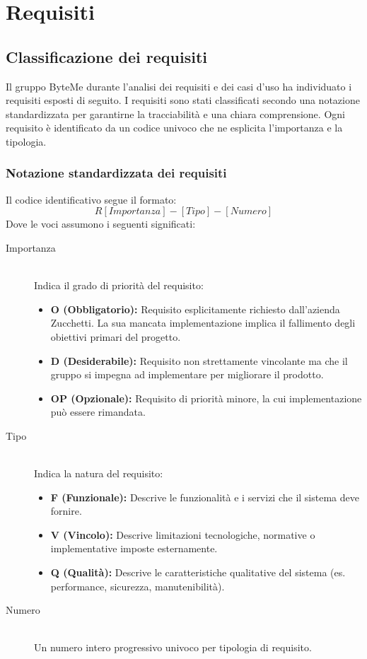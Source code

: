 \documentclass[11pt,a4paper]{article}
\begin{document}
\newpage

\section{Requisiti}
\subsection{Classificazione dei requisiti}
Il gruppo ByteMe durante l'analisi dei requisiti e dei casi d'uso ha individuato i requisiti esposti di seguito.
I requisiti sono stati classificati secondo una notazione standardizzata per garantirne la tracciabilità e una chiara comprensione.
Ogni requisito è identificato da un codice univoco che ne esplicita l'importanza e la tipologia.

\subsubsection{Notazione standardizzata dei requisiti}
Il codice identificativo segue il formato:
\[
R[Importanza]-[Tipo]-[Numero]
\]
Dove le voci assumono i seguenti significati:

\begin{description}
    \item[Importanza] \hfill \\
    Indica il grado di priorità del requisito:
    \begin{itemize}
        \item \textbf{O (Obbligatorio):} Requisito esplicitamente richiesto dall'azienda Zucchetti. La sua mancata implementazione implica il fallimento degli obiettivi primari del progetto.
        \item \textbf{D (Desiderabile):} Requisito non strettamente vincolante ma che il gruppo si impegna ad implementare per migliorare il prodotto.
        \item \textbf{OP (Opzionale):} Requisito di priorità minore, la cui implementazione può essere rimandata.
    \end{itemize}
    
    \item[Tipo] \hfill \\
    Indica la natura del requisito:
    \begin{itemize}
        \item \textbf{F (Funzionale):} Descrive le funzionalità e i servizi che il sistema deve fornire.
        \item \textbf{V (Vincolo):} Descrive limitazioni tecnologiche, normative o implementative imposte esternamente.
        \item \textbf{Q (Qualità):} Descrive le caratteristiche qualitative del sistema (es. performance, sicurezza, manutenibilità).
    \end{itemize}
    
    \item[Numero] \hfill \\
    Un numero intero progressivo univoco per tipologia di requisito.
\end{description}
\end{document}
